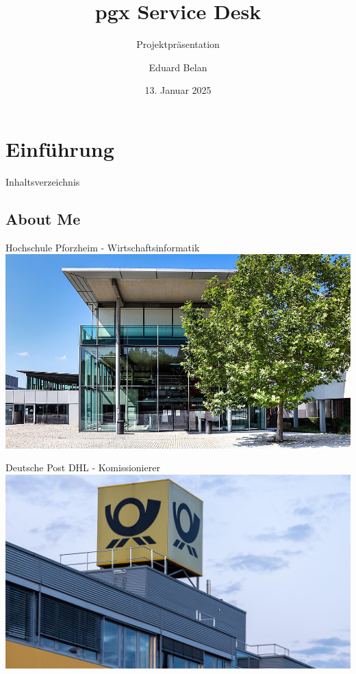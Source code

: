 \documentclass[UKenglish,aspectratio=169]{beamer}
\author{Eduard Belan}
\title{pgx Service Desk}
\subtitle{Projektpräsentation}
\date{13. Januar 2025}
\begin{document}
\hidelogo
\section{Einführung}
\begin{frame}{Inhaltsverzeichnis}
  \vspace{3em}
  \hspace{1em}
  \begin{minipage}{0.48\textwidth}
    {\small
      \tableofcontents[sections={1-3}]
    }
  \end{minipage}
  \hfill
  \begin{minipage}{0.48\textwidth}
    {\small
      \tableofcontents[sections={4-7}]
    }
  \end{minipage}
\end{frame}
\subsection{About Me}
\SubSectionPage
\begin{frame}{Hochschule Pforzheim - Wirtschaftsinformatik}
  \centering
    \includegraphics[width=\linewidth,height=\dimexpr\textheight\relax,keepaspectratio]{UiB-images/hspf.jpg}
\end{frame}

\begin{frame}{Deutsche Post DHL - Komissionierer}
  \centering
    \includegraphics[width=\linewidth,height=\dimexpr\textheight\relax,keepaspectratio]{UiB-images/dpdhl.jpg}
\end{frame}
\end{document}
